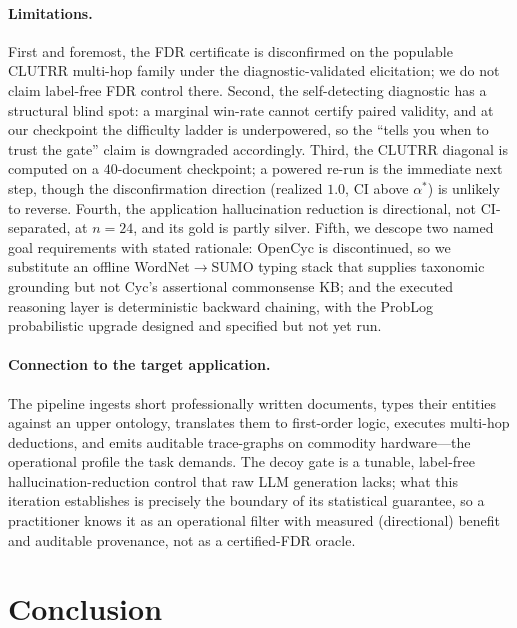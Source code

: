 \documentclass[11pt,letterpaper]{article}
\begin{document}
\paragraph{Limitations.} First and foremost, the FDR certificate is disconfirmed on the populable CLUTRR multi-hop family under the diagnostic-validated elicitation; we do not claim label-free FDR control there. Second, the self-detecting diagnostic has a structural blind spot: a marginal win-rate cannot certify paired validity, and at our checkpoint the difficulty ladder is underpowered, so the ``tells you when to trust the gate'' claim is downgraded accordingly. Third, the CLUTRR diagonal is computed on a $40$-document checkpoint; a powered re-run is the immediate next step, though the disconfirmation direction (realized $1.0$, CI above $\alpha^{*}$) is unlikely to reverse. Fourth, the application hallucination reduction is directional, not CI-separated, at $n=24$, and its gold is partly silver. Fifth, we descope two named goal requirements with stated rationale: OpenCyc is discontinued, so we substitute an offline WordNet$\to$SUMO typing stack that supplies taxonomic grounding but not Cyc's assertional commonsense KB; and the executed reasoning layer is deterministic backward chaining, with the ProbLog probabilistic upgrade designed and specified but not yet run.

\paragraph{Connection to the target application.} The pipeline ingests short professionally written documents, types their entities against an upper ontology, translates them to first-order logic, executes multi-hop deductions, and emits auditable trace-graphs on commodity hardware---the operational profile the task demands. The decoy gate is a tunable, label-free hallucination-reduction control that raw LLM generation lacks; what this iteration establishes is precisely the boundary of its statistical guarantee, so a practitioner knows it as an operational filter with measured (directional) benefit and auditable provenance, not as a certified-FDR oracle.

\section{Conclusion}
\end{document}
